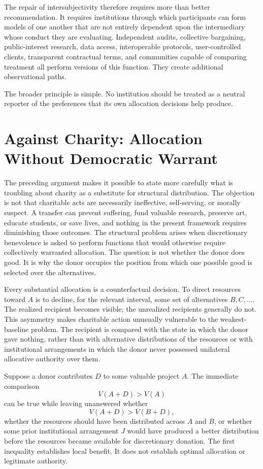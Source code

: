 \documentclass[11pt]{article}
\begin{document}
The repair of intersubjectivity therefore requires more than better recommendation. It requires institutions through which participants can form models of one another that are not entirely dependent upon the intermediary whose conduct they are evaluating. Independent audits, collective bargaining, public-interest research, data access, interoperable protocols, user-controlled clients, transparent contractual terms, and communities capable of comparing treatment all perform versions of this function. They create additional observational paths.

The broader principle is simple. No institution should be treated as a neutral reporter of the preferences that its own allocation decisions help produce.

\section{Against Charity: Allocation Without Democratic Warrant}

The preceding argument makes it possible to state more carefully what is troubling about charity as a substitute for structural distribution. The objection is not that charitable acts are necessarily ineffective, self-serving, or morally suspect. A transfer can prevent suffering, fund valuable research, preserve art, educate students, or save lives, and nothing in the present framework requires diminishing those outcomes. The structural problem arises when discretionary benevolence is asked to perform functions that would otherwise require collectively warranted allocation. The question is not whether the donor does good. It is why the donor occupies the position from which one possible good is selected over the alternatives.

Every substantial allocation is a counterfactual decision. To direct resources toward \(A\) is to decline, for the relevant interval, some set of alternatives \(B,C,\ldots\). The realized recipient becomes visible; the unrealized recipients generally do not. This asymmetry makes charitable action unusually vulnerable to the weakest-baseline problem. The recipient is compared with the state in which the donor gave nothing, rather than with alternative distributions of the resources or with institutional arrangements in which the donor never possessed unilateral allocative authority over them.

Suppose a donor contributes \(D\) to some valuable project \(A\). The immediate comparison
\[
V(A+D) > V(A)
\]
can be true while leaving unanswered whether
\[
V(A+D)
>
V(B+D),
\]
whether the resources should have been distributed across \(A\) and \(B\), or whether some prior institutional arrangement \(J\) would have produced a better distribution before the resources became available for discretionary donation. The first inequality establishes local benefit. It does not establish optimal allocation or legitimate authority.
\end{document}
